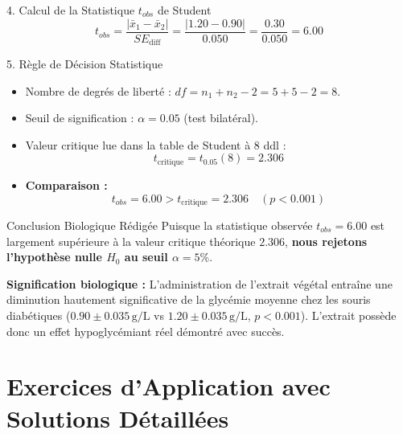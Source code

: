 \documentclass[11pt,a4paper]{article}
\begin{document}
\begin{stepbox}{4. Calcul de la Statistique $t_{obs}$ de Student}
\begin{equation*}
t_{obs} = \frac{|\bar{x}_1 - \bar{x}_2|}{SE_{\text{diff}}} = \frac{|1.20 - 0.90|}{0.050} = \frac{0.30}{0.050} = \mathbf{6.00}
\end{equation*}
\end{stepbox}

\begin{stepbox}{5. Règle de Décision Statistique}
\begin{itemize}[leftmargin=*, label=\faAngleRight]
  \item Nombre de degrés de liberté : $df = n_1 + n_2 - 2 = 5 + 5 - 2 = 8$.
  \item Seuil de signification : $\alpha = 0.05$ (test bilatéral).
  \item Valeur critique lue dans la table de Student à 8 ddl :
  \begin{equation*}
    t_{\text{critique}} = t_{0.05}(8) = \mathbf{2.306}
  \end{equation*}
  \item \textbf{Comparaison :}
  \begin{equation*}
    t_{obs} = 6.00 > t_{\text{critique}} = 2.306 \quad (p < 0.001)
  \end{equation*}
\end{itemize}
\end{stepbox}

\begin{takeawaybox}{Conclusion Biologique Rédigée}
Puisque la statistique observée $t_{obs} = 6.00$ est largement supérieure à la valeur critique théorique $2.306$, \textbf{nous rejetons l'hypothèse nulle $H_0$ au seuil $\alpha = 5\%$}.

\textbf{Signification biologique :} L'administration de l'extrait végétal entraîne une diminution hautement significative de la glycémie moyenne chez les souris diabétiques ($0.90 \pm 0.035\,\text{g/L}$ vs $1.20 \pm 0.035\,\text{g/L}$, $p < 0.001$). L'extrait possède donc un effet hypoglycémiant réel démontré avec succès.
\end{takeawaybox}

\section{Exercices d'Application avec Solutions Détaillées}
\end{document}
